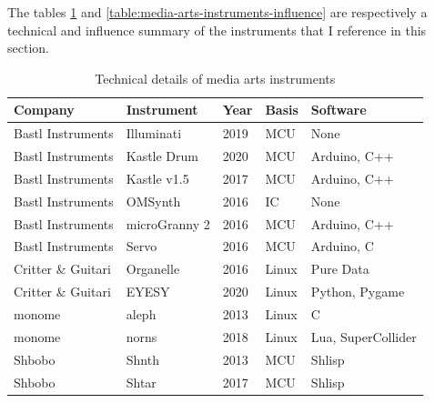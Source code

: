 The tables \ref{table:media-arts-instruments-technical} and \ref{table:media-arts-instruments-influence} are respectively a technical and influence summary of the instruments that I reference in this section.

\begin{table}[ht]
    \centering
    \begin{tabular}{ | l |  l | l | l | l |}
        \hline
        Company             & Instrument    & Year  & Basis & Software            \\
        \hline
        Bastl Instruments   & Illuminati    & 2019  & MCU       & None                \\
        Bastl Instruments   & Kastle Drum   & 2020  & MCU       & Arduino, C++        \\
        Bastl Instruments   & Kastle v1.5   & 2017  & MCU       & Arduino, C++        \\
        Bastl Instruments   & OMSynth       & 2016  & IC        & None                \\
        Bastl Instruments   & microGranny 2 & 2016  & MCU       & Arduino, C++        \\
        Bastl Instruments   & Servo         & 2016  & MCU       & Arduino, C          \\
        Critter \& Guitari  & Organelle     & 2016  & Linux     & Pure Data           \\
        Critter \& Guitari  & EYESY         & 2020  & Linux     & Python, Pygame      \\
        monome              & aleph         & 2013  & Linux     & C                   \\
        monome              & norns         & 2018  & Linux     & Lua, SuperCollider  \\
        Shbobo              & Shnth         & 2013  & MCU       & Shlisp              \\
        Shbobo              & Shtar         & 2017  & MCU       & Shlisp              \\
        \hline
    \end{tabular}
    \caption{Technical details of media arts instruments}
    \label{table:media-arts-instruments-technical}
\end{table}{}

